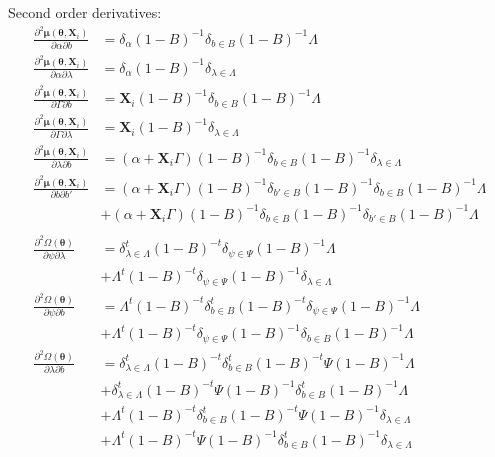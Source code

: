 \documentclass[table]{article}
\newcommand{\VX}{\boldsymbol{X}}
\newcommand{\Vmu}{\boldsymbol{\mu}}
\newcommand{\param}{\theta}
\newcommand{\Vparam}{\boldsymbol{\param}}
\begin{document}
Second order derivatives:
\begin{align*}
 \frac{\partial^2 \Vmu(\Vparam,\VX_i)}{\partial \alpha \partial b} &= \delta_{\alpha} (1-B)^{-1} \delta_{b \in B} (1-B)^{-1} \Lambda \\
 \frac{\partial^2 \Vmu(\Vparam,\VX_i)}{\partial \alpha \partial \lambda} &= \delta_{\alpha} (1-B)^{-1} \delta_{\lambda \in \Lambda} \\
 \frac{\partial^2 \Vmu(\Vparam,\VX_i)}{\partial \Gamma \partial b} &= \VX_i (1-B)^{-1} \delta_{b \in B} (1-B)^{-1} \Lambda \\
 \frac{\partial^2 \Vmu(\Vparam,\VX_i)}{\partial \Gamma \partial \lambda} &= \VX_i (1-B)^{-1} \delta_{\lambda \in \Lambda} \\
 \frac{\partial^2 \Vmu(\Vparam,\VX_i)}{\partial \lambda \partial b } &=  (\alpha + \VX_i \Gamma)(1-B)^{-1} \delta_{b \in B} (1-B)^{-1} \delta_{\lambda \in \Lambda} \\
 \frac{\partial^2 \Vmu(\Vparam,\VX_i)}{\partial b \partial b'} &= (\alpha + \VX_i \Gamma)(1-B)^{-1}\delta_{b' \in B}(1-B)^{-1}\delta_{b \in B}(1-B)^{-1}\Lambda \\
& + (\alpha + \VX_i \Gamma)(1-B)^{-1}\delta_{b \in B}(1-B)^{-1}\delta_{b' \in B}(1-B)^{-1}\Lambda  \\
& \\
 \frac{\partial^2 \Omega(\Vparam)}{\partial \psi \partial \lambda} &=  \delta_{\lambda \in \Lambda}^t (1-B)^{-t} \delta_{\psi \in \Psi} (1-B)^{-1} \Lambda  \\
& + \Lambda^t (1-B)^{-t} \delta_{\psi \in \Psi} (1-B)^{-1} \delta_{\lambda \in \Lambda}  \\
 \frac{\partial^2 \Omega(\Vparam)}{\partial \psi \partial b} &= \Lambda^t (1-B)^{-t} \delta^t_{b \in B} (1-B)^{-t} \delta_{\psi \in \Psi} (1-B)^{-1} \Lambda \\
& + \Lambda^t (1-B)^{-t} \delta_{\psi \in \Psi} (1-B)^{-1} \delta_{b \in B} (1-B)^{-1} \Lambda  \\
 \frac{\partial^2 \Omega(\Vparam)}{\partial \lambda \partial b} &= \delta_{\lambda \in \Lambda}^t (1-B)^{-t} \delta^t_{b \in B} (1-B)^{-t} \Psi (1-B)^{-1} \Lambda \\
& + \delta_{\lambda \in \Lambda}^t (1-B)^{-t} \Psi (1-B)^{-1} \delta^t_{b \in B} (1-B)^{-1} \Lambda \\
& + \Lambda^t (1-B)^{-t} \delta^t_{b \in B} (1-B)^{-t} \Psi (1-B)^{-1} \delta_{\lambda \in \Lambda} \\
& + \Lambda^t (1-B)^{-t}  \Psi (1-B)^{-1} \delta^t_{b \in B} (1-B)^{-1} \delta_{\lambda \in \Lambda}  \\

\end{align*}
\end{document}
